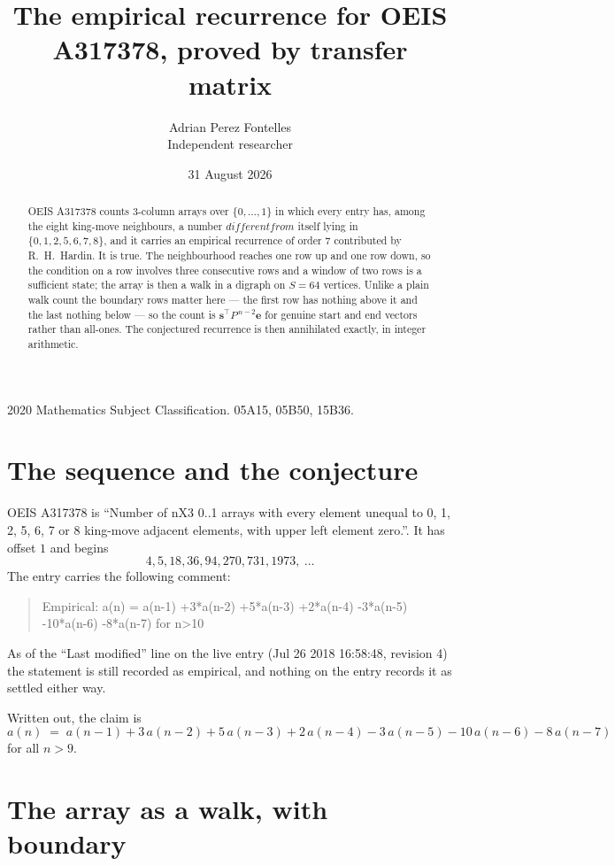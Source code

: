 \documentclass[11pt,a4paper]{article}
\title{The empirical recurrence for OEIS A317378, proved by transfer matrix}
\author{Adrian Perez Fontelles\\ \small Independent researcher}
\date{31 August 2026}
\theoremstyle{plain}
\theoremstyle{definition}
\begin{document}
\maketitle

\begin{abstract}
OEIS A317378 counts $3$-column arrays over $\{0,\dots,1\}$ in which every entry has,
among the eight king-move neighbours, a number $different from$ itself lying in $\{0,1,2,5,6,7,8\}$, and it carries an empirical
recurrence of order $7$ contributed by R.~H.~Hardin. It is true. The neighbourhood
reaches one row up and one row down, so the condition on a row involves three consecutive
rows and a window of two rows is a sufficient state; the array is then a walk in a digraph
on $S=64$ vertices. Unlike a plain walk count the boundary rows matter here --- the first
row has nothing above it and the last nothing below --- so the count is
$\mathbf{s}^{\!\top}P^{\,n-2}\mathbf{e}$ for genuine start and end vectors rather than
all-ones. The conjectured recurrence is then annihilated exactly, in integer arithmetic.
\end{abstract}

\noindent\small 2020 Mathematics Subject Classification. 05A15, 05B50, 15B36.\normalsize

\section{The sequence and the conjecture}

OEIS A317378 is ``Number of nX3 0..1 arrays with every element unequal to 0, 1, 2, 5, 6, 7 or 8 king-move adjacent elements, with upper left element zero.''. It has offset
$1$ and begins
\[
4, 5, 18, 36, 94, 270, 731, 1973,\ \dots
\]
The entry carries the following comment:
\begin{quote}\small
Empirical: a(n) = a(n-1) +3*a(n-2) +5*a(n-3) +2*a(n-4) -3*a(n-5) -10*a(n-6) -8*a(n-7) for n>10
\end{quote}
As of the ``Last modified'' line on the live entry (Jul 26 2018 16:58:48, revision
4) the statement is still recorded as empirical, and nothing on the entry
records it as settled either way.

Written out, the claim is
\begin{equation}\label{eq:conj}
a(n)\;=\;a(n-1) + 3\,a(n-2) + 5\,a(n-3) + 2\,a(n-4) - 3\,a(n-5) - 10\,a(n-6) - 8\,a(n-7)
\end{equation}
for all $n>9$.

\section{The array as a walk, with boundary}
\end{document}
